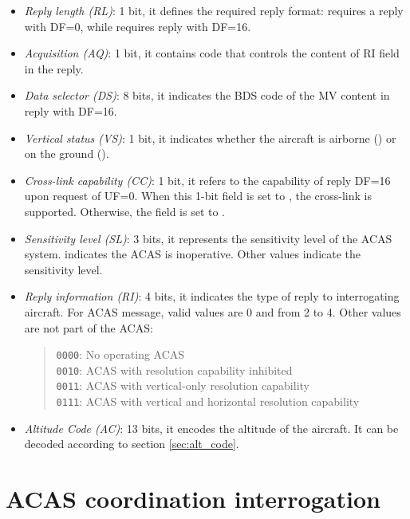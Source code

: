 \begin{itemize}
  \item \emph{Reply length (RL)}: 1 bit, it defines the required reply format: \0 requires a reply with DF=0, while \1 requires reply with DF=16.

  \item \emph{Acquisition (AQ)}: 1 bit, it contains code that controls the content of RI field in the reply.

  \item \emph{Data selector (DS)}: 8 bits, it indicates the BDS code of the MV content in reply with DF=16.

  \item \emph{Vertical status (VS)}: 1 bit, it indicates whether the aircraft is airborne (\0) or on the ground (\1).

  \item \emph{Cross-link capability (CC)}: 1 bit, it refers to the capability of reply DF=16 upon request of UF=0. When this 1-bit field is set to \1, the cross-link is supported. Otherwise, the field is set to \0.

  \item \emph{Sensitivity level (SL)}: 3 bits, it represents the sensitivity level of the ACAS system. \0 indicates the ACAS is inoperative. Other values indicate the sensitivity level.

  \item \emph{Reply information (RI)}: 4 bits, it indicates the type of reply to interrogating aircraft. For ACAS message, valid values are 0 and from 2 to 4. Other values are not part of the ACAS:

  \begin{quote}
    \texttt{0000}: No operating ACAS \\
    \texttt{0010}: ACAS with resolution capability inhibited \\
    \texttt{0011}: ACAS with vertical-only resolution capability \\
    \texttt{0111}: ACAS with vertical and horizontal resolution capability
  \end{quote}

  \item \emph{Altitude Code (AC)}: 13 bits, it encodes the altitude of the aircraft. It can be decoded according to section \ref{sec:alt_code}.

\end{itemize}



\section{ACAS coordination interrogation}

